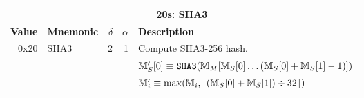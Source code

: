 \documentclass[9pt,oneside]{amsart}
\DeclarePairedDelimiter{\ceil}{\lceil}{\rceil}
\begin{document}
\begin{tabular*}{\columnwidth}[h]{rlrrl}
\toprule
\multicolumn{5}{c}{\textbf{20s: SHA3}} \vspace{5pt} \\
\textbf{Value} & \textbf{Mnemonic} & $\delta$ & $\alpha$ & \textbf{Description} \vspace{5pt} \\
0x20 & {\small SHA3} & 2 & 1 & Compute SHA3-256 hash. \\
&&&& $\mathbb{M}'_S[0] \equiv \mathtt{\tiny SHA3}(\mathbb{M}_M[ \mathbb{M}_S[0] \dots (\mathbb{M}_S[0] + \mathbb{M}_S[1] - 1) ])$ \\
&&&& $\mathbb{M}'_i \equiv \max(\mathbb{M}_i, \ceil{ (\mathbb{M}_S[0] + \mathbb{M}_S[1]) \div 32 })$ \\
\bottomrule
\end{tabular*}
\end{document}
